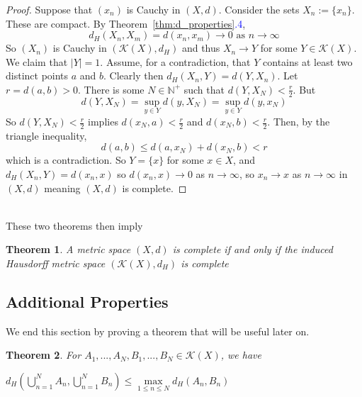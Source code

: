 \documentclass{article}
\theoremstyle{plain}
\newtheorem{thm}{Theorem}[section]
\theoremstyle{definition}
\theoremstyle{remark}
\begin{document}
\begin{proof}
    Suppose that $(x_n)$ is Cauchy in $(X,d)$. Consider the sets $X_n := \{x_n\}$. These are compact. By Theorem~\ref{thm:d_properties}\textcolor{blue}{.4}, \[d_H(X_n, X_m) = d(x_n, x_m) \to 0 \text{ as } n\to \infty\]
    So $(X_n)$ is Cauchy in $(\mathcal{K}(X), d_H)$ and thus $X_n \to Y$ for some $Y\in \mathcal{K}(X)$. We claim that $|Y| = 1$. Assume, for a contradiction, that $Y$ contains at least two distinct points $a$ and $b$. Clearly then $d_H(X_n, Y)=d(Y,X_n)$. Let $r = d(a,b) >0$. There is some $N \in \mathbb{N}^+$ such that $d(Y, X_N)<\frac{r}{2}$. But \[d(Y, X_N) = \sup \limits _{y\in Y}d(y, X_N) = \sup \limits _{y\in Y}d(y, x_N)\]So $d(Y, X_N) < \frac{r}{2}$ implies $d(x_N, a) < \frac{r}{2}$ and $d(x_N, b) < \frac{r}{2}$. Then, by the triangle inequality, \[d(a,b) \le d(a, x_N) + d(x_N, b) <r\] which is a contradiction. So $Y = \{x\}$ for some $x \in X$, and $d_H(X_n, Y)=d(x_n, x)$ so $d(x_n, x) \to 0$ as $n \to \infty$, so $x_n \to x$ as $n \to \infty $ in $(X,d)$ meaning $(X,d)$ is complete.
\end{proof}

~\\These two theorems then imply
\begin{thm}\label{thm:haus_met}
    A metric space $(X,d)$ is complete if and only if the induced Hausdorff metric space $(\mathcal{K}(X), d_H)$ is complete
\end{thm}

\newpage

\subsection{Additional Properties}
We end this section by proving a theorem that will be useful later on.

\begin{thm}\label{thm:haus_additional}
    For $A_1, ..., A_N, B_1, ..., B_N \in \mathcal{K}(X)$, we have
    \begin{center}
        $d_H \left ( \bigcup \limits _{n=1}^N A_n, \bigcup \limits _{n=1}^N B_n \right ) \le \max \limits _{1\le n\le N} d_H(A_n, B_n)$
    \end{center}
\end{thm}
\end{document}
